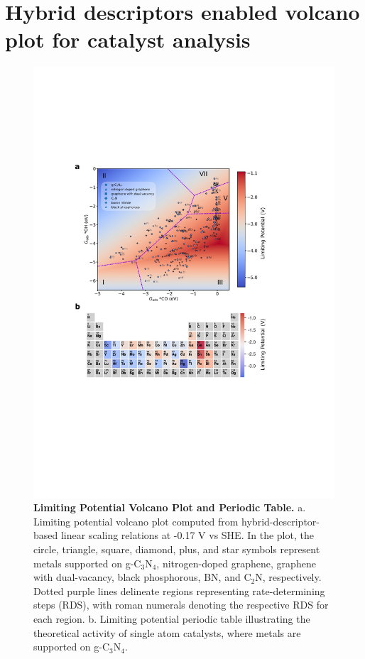 

\section{Hybrid descriptors enabled volcano plot for catalyst analysis}

\begin{figure}
    \centering
    \includegraphics[width=0.95\linewidth]{main_sections/figures/figure_3.JPG}
    \caption{\textbf{Limiting Potential Volcano Plot and Periodic Table.}
    a. Limiting potential volcano plot computed from hybrid-descriptor-based linear scaling relations at -0.17 V vs SHE.
    In the plot, the circle, triangle, square, diamond, plus, and star symbols represent metals supported on g-$\mathrm{C_3N_4}$, nitrogen-doped graphene, graphene with dual-vacancy, black phosphorous, BN, and $\mathrm{C_2N}$, respectively.
    Dotted purple lines delineate regions representing rate-determining steps (RDS), with roman numerals denoting the respective RDS for each region.
    b. Limiting potential periodic table illustrating the theoretical activity of single atom catalysts, where metals are supported on g-$\mathrm{C_3N_4}$.}
    \label{main_fig3:volcano}
\end{figure}

